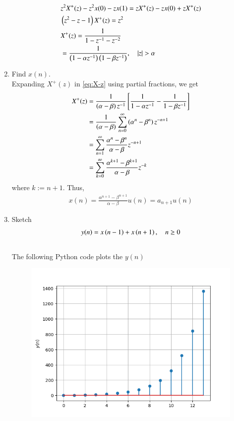 \documentclass[journal,12pt,twocolumn]{IEEEtran}
\renewcommand\thesection{\arabic{section}}
\begin{document}
\begin{enumerate}[label=\thesection.\arabic*,ref=\thesection.\theenumi]
\begin{align}
    &z^2X^+(z) - z^2x(0) - zx(1) = zX^+(z) - zx(0) + zX^+(z) \\
    &\left(z^2 - z - 1\right)X^+(z) = z^2 \\
    &X^+(z) = \frac{1}{1 - z^{-1} - z^{-2}} \\
    &= \frac{1}{\left(1 - \alpha z^{-1}\right)\left(1 - \beta z^{-1}\right)}, \quad |z| > \alpha
    \label{eq:X-z}
\end{align}
\item Find $x(n)$.
\\
\solution Expanding $X^+(z)$ in \eqref{eq:X-z} using partial fractions, we get
\begin{align}
    X^+(z) &= \frac{1}{\left(\alpha - \beta\right)z^{-1}}{}\left[\frac{1}{1 - \alpha z^{-1}} - \frac{1}{1 - \beta z^{-1}}\right] \\
           &= \frac{1}{\left(\alpha - \beta\right)}\sum_{n = 0}^{\infty}\left(\alpha^n - \beta^n\right)z^{-n + 1} \\
           &= \sum_{n = 1}^{\infty}\frac{\alpha^{n} - \beta^{n}}{\alpha - \beta}z^{-n + 1} \\
           &= \sum_{k = 0}^{\infty}\frac{\alpha^{k + 1} - \beta^{k + 1}}{\alpha - \beta}z^{-k}
\end{align}
where $k := n + 1$. Thus,
\begin{align}
    x(n) = \frac{\alpha^{n + 1} - \beta^{n + 1}}{\alpha - \beta}u(n) = a_{n + 1}u(n)
    \label{eq:x-n-def}
\end{align}
	\item Sketch 
\begin{align}
	y(n) = x\left(n-1\right) + x\left(n+1\right),  \quad n \ge 0
	\label{eq:10-orig-diff-rev}
\end{align}
\\
\solution
The following Python code plots the $y(n)$

\begin{figure}[!htbp]
    \includegraphics[width=\columnwidth]{figures/Figure_2_5.png}

\end{figure}
\end{enumerate}
\end{document}
